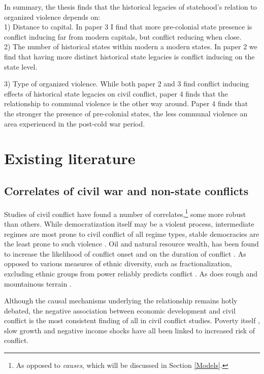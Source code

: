 \documentclass[12pt]{article}
\begin{document}
In summary, the thesis finds that the historical legacies of statehood's
relation to organized violence depends on:\\

1) Distance to capital. In paper 3 I find that more pre-colonial state presence
is conflict inducing far from modern capitals, but conflict reducing when
close.\\

2) The number of historical states within modern a modern states. In paper 2 we
find that having more distinct historical state legacies is conflict inducing on
the state level.

3) Type of organized violence. While both paper 2 and 3 find conflict inducing
effects of historical state legacies on civil conflict, paper 4 finds that the
relationship to communal violence is the other way around. Paper 4 finds that
the stronger the presence of pre-colonial states, the less communal violence an
area experienced in the post-cold war period.

\section{Existing literature} \label{Existing literature}
\subsection{Correlates of civil war and non-state conflicts} 
\label{Correlates of civil war and non-state conflicts}

Studies of civil conflict have found a number of correlates,\footnote{As opposed
to \textit{causes}, which will be discussed in Section \ref{Models}.} some more robust
than others. While democratization itself may be a violent process, intermediate
regimes are most prone to civil conflict of all regime types, stable democracies
are the least prone to such violence \citep{Hegre2001, Goldstone_2010}. 
Oil and natural resource wealth, has been found to increase the likelihood of
conflict onset and on the duration of conflict \citep{Lujala2010, Lujala2005,
Lujala_2008, Ross_2006}. As opposed to various measures of ethnic diversity,
such as fractionalization, excluding ethnic groups from power reliably predicts
conflict \citep{CedermanLars-Erik2013Igac}. As does rough and mountainous
terrain \citep{Buhaug_2010, Hegre2006}.

Although the causal mechanisms underlying the relationship remains hotly debated,
the negative association between economic development and civil conflict is the
most consistent finding of all in civil conflict studies. Poverty itself
\citep{Hegre2006}, slow growth \citep{Hegre2006} and negative income shocks have
all been linked to increased risk of conflict.
\end{document}
